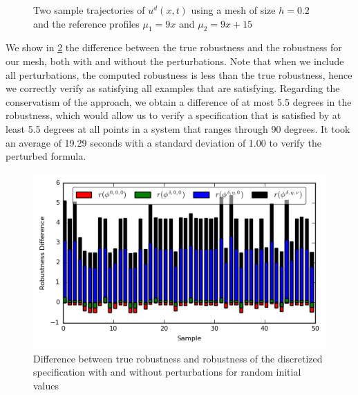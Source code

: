 \documentclass[oribibl]{llncs/llncs}
\begin{document}
\begin{figure}[!t]
    \centering 
        \hfill
        \hfill
        \caption{Two sample trajectories of $u^d(x, t)$ using a mesh of size
        $h=0.2$ and the reference profiles $\mu_1 = 9x$ and $\mu_2 = 9x + 15$}
    \label{fig:ex2_evolution}
\end{figure}


We show in \cref{fig:res_diffs} the difference between the true robustness and
the robustness for our mesh, both with and without the perturbations. Note that
when we include all perturbations, the computed robustness is less than the true
robustness, hence we correctly verify as satisfying all examples
that are satisfying. Regarding the conservatism of the approach, we obtain a
difference of at most 5.5 degrees in the robustness, which would allow us to verify a
specification that is satisfied by at least 5.5 degrees at all points in a system
that ranges through 90 degrees. It took an average of 19.29 seconds with a
standard deviation of 1.00 to verify the perturbed formula.

\begin{figure}
    \centering
    \includegraphics[width=0.8\linewidth]{figures/cs_ran_init_results.png}
    \caption{Difference between true robustness and robustness of the
        discretized specification with and without perturbations for
        random initial values}
    \label{fig:res_diffs}
\end{figure}
\end{document}
